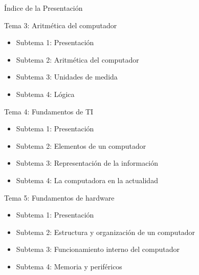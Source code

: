 \documentclass[10pt,aspectratio=169]{beamer}
\begin{document}
	\begin{frame}{Índice de la Presentación}
		
		\small
		
		\begin{block}{Tema 3: Aritmética del computador}
			\begin{itemize}
				\item Subtema 1: Presentación
				\item Subtema 2: Aritmética del computador
				\item Subtema 3: Unidades de medida
				\item Subtema 4: Lógica
			\end{itemize}
		\end{block}
		
		\begin{block}{Tema 4: Fundamentos de TI}
			\begin{itemize}
				\item Subtema 1: Presentación
				\item Subtema 2: Elementos de un computador
				\item Subtema 3: Representación de la información
				\item Subtema 4: La computadora en la actualidad
			\end{itemize}
		\end{block}
		
		\begin{block}{Tema 5: Fundamentos de hardware}
			\begin{itemize}
				\item Subtema 1: Presentación
				\item Subtema 2: Estructura y organización de un computador
				\item Subtema 3: Funcionamiento interno del computador
				\item Subtema 4: Memoria y periféricos
			\end{itemize}
		\end{block}
		
	\end{frame}
	
	
\end{document}
